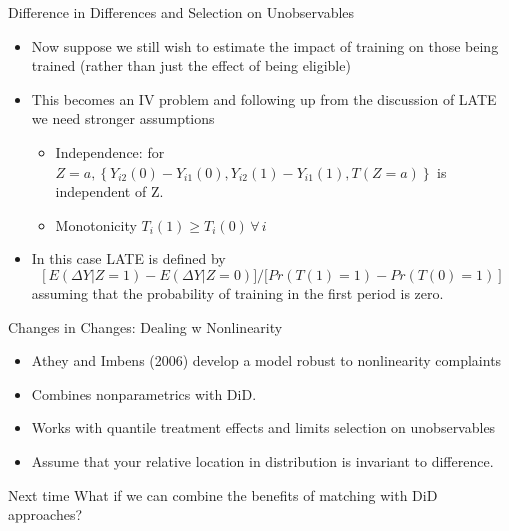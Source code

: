 \documentclass[xcolor=pdftex,dvipsnames,table,mathserif,aspectratio=169]{beamer}
\begin{document}
\begin{frame}{Difference in Differences and Selection on Unobservables}
\begin{itemize}
\item Now suppose we still wish to estimate the impact of training on those being trained (rather than just the effect of being eligible)
\item This becomes an IV problem and following up from the discussion of LATE we need stronger assumptions
\begin{itemize}
\item  Independence: for $Z = a, \left\{Y_{i2}(0) - Y_{i1}(0), Y_{i2}(1) - Y_{i1}(1), T(Z=a)\right\}$ is independent of Z.
\item Monotonicity $T_i(1) \ge T_i(0) \, \forall \, i$
\end{itemize}
\item In this case LATE is defined by
 $$\left [E(\Delta Y | Z = 1) - E(\Delta Y | Z = 0)] / [Pr(T(1) = 1) - Pr(T(0) = 1) \right]$$
assuming that the probability of training in the first period is zero.
\end{itemize}              
\end{frame}

\begin{frame}{Changes in Changes: Dealing w Nonlinearity}
\begin{itemize}
\item Athey and Imbens (2006) develop a model robust to nonlinearity complaints
\item Combines nonparametrics with DiD.
\item Works with \alert{quantile treatment effects} and limits selection on unobservables
\item Assume that your relative location in distribution is invariant to difference.
\end{itemize}
\end{frame}

\begin{frame}{Next time}
What if we can combine the benefits of matching with DiD approaches?
\end{frame}
\end{document}
